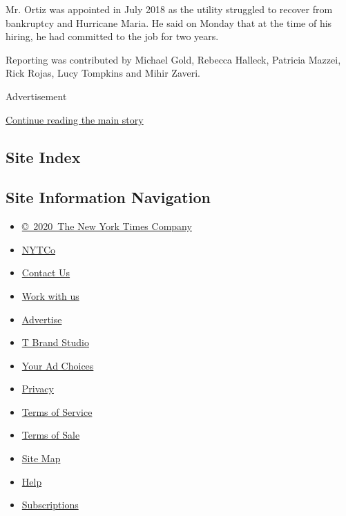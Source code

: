 Mr. Ortiz was appointed in July 2018 as the utility struggled to recover
from bankruptcy and Hurricane Maria. He said on Monday that at the time
of his hiring, he had committed to the job for two years.

Reporting was contributed by Michael Gold, Rebecca Halleck, Patricia
Mazzei, Rick Rojas, Lucy Tompkins and Mihir Zaveri.

Advertisement

\protect\hyperlink{after-bottom}{Continue reading the main story}

\hypertarget{site-index}{%
\subsection{Site Index}\label{site-index}}

\hypertarget{site-information-navigation}{%
\subsection{Site Information
Navigation}\label{site-information-navigation}}

\begin{itemize}
\tightlist
\item
  \href{https://help.nytimes.com/hc/en-us/articles/115014792127-Copyright-notice}{©~2020~The
  New York Times Company}
\end{itemize}

\begin{itemize}
\tightlist
\item
  \href{https://www.nytco.com/}{NYTCo}
\item
  \href{https://help.nytimes.com/hc/en-us/articles/115015385887-Contact-Us}{Contact
  Us}
\item
  \href{https://www.nytco.com/careers/}{Work with us}
\item
  \href{https://nytmediakit.com/}{Advertise}
\item
  \href{http://www.tbrandstudio.com/}{T Brand Studio}
\item
  \href{https://www.nytimes.com/privacy/cookie-policy\#how-do-i-manage-trackers}{Your
  Ad Choices}
\item
  \href{https://www.nytimes.com/privacy}{Privacy}
\item
  \href{https://help.nytimes.com/hc/en-us/articles/115014893428-Terms-of-service}{Terms
  of Service}
\item
  \href{https://help.nytimes.com/hc/en-us/articles/115014893968-Terms-of-sale}{Terms
  of Sale}
\item
  \href{https://spiderbites.nytimes.com}{Site Map}
\item
  \href{https://help.nytimes.com/hc/en-us}{Help}
\item
  \href{https://www.nytimes.com/subscription?campaignId=37WXW}{Subscriptions}
\end{itemize}
